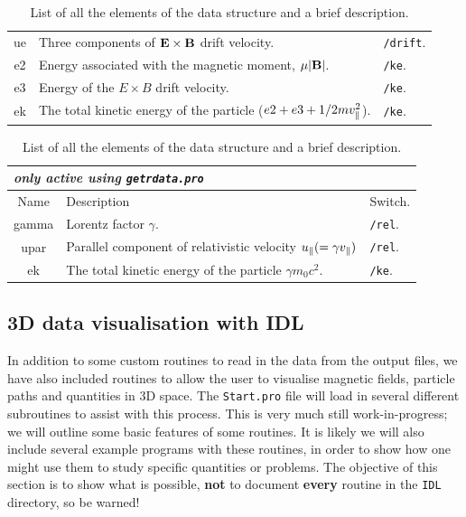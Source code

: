 \documentclass[a4paper,11pt,usenames,dvipsnames]{article}
\begin{document}
\begin{table}[ht]
\begin{flushleft}
\begin{tabular}{|c|p{}|l|}
ue& Three components of ${\bf{E}}\times{\bf{B}}$ drift velocity. & \texttt{/drift}.\\
e2& Energy associated with the magnetic moment, $\mu|{\bf{B}}|$. & \texttt{/ke}.\\
e3& Energy of the ${{E}}\times{{B}}$ drift velocity. & \texttt{/ke}.\\
ek& The total kinetic energy of the particle ($e2+e3+1/2mv_{\parallel}^2$). & \texttt{/ke}.\\
\hline
\end{tabular}
\begin{tabular}{|c|p{}|l|}
\multicolumn{3}{l}{{\em only active using \texttt{getrdata.pro}}}\\
\hline
Name&Description&Switch.\\
\hline
gamma&Lorentz factor $\gamma$.& \texttt{/rel}.\\
upar&Parallel component of relativistic velocity $u_{\parallel}(=\gamma v_{\parallel})$& \texttt{/rel}.\\
ek& The total kinetic energy of the particle $\gamma m_0c^2$. & \texttt{/ke}.\\
\hline
\end{tabular}
\end{flushleft}
\caption{List of all the elements of the data structure and a brief description.}
\label{tab:datastructure}
\end{table} 

\subsection{3D data visualisation with IDL}
In addition to some custom routines to read in the data from the output files, we have also included routines to allow the user to visualise magnetic fields, particle paths and quantities in 3D space. The \texttt{Start.pro} file will load in several different subroutines to assist with this process. This is very much still work-in-progress; we will outline some basic features of some routines. It is likely we will also include several example programs with these routines, in order to show how one might use them to study specific quantities or problems. The objective of this section is to show what is possible, {\bf{not}} to document {\bf{every}} routine in the \texttt{IDL} directory, so be warned!
\end{document}
